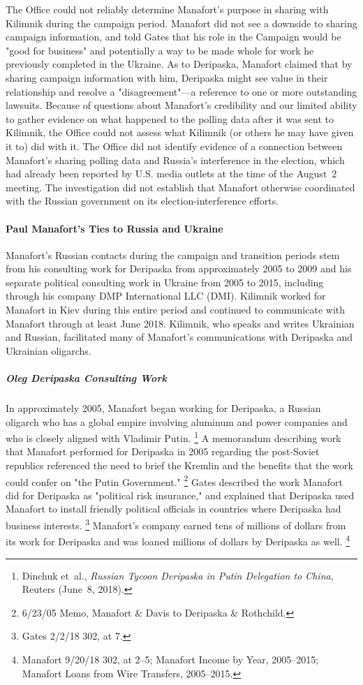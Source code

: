 The Office could not reliably determine Manafort's purpose in sharing with Kilimnik during the campaign period.
Manafort
did not see a downside to sharing campaign information, and told Gates that his role in the Campaign would be "good for business" and potentially a way to be made whole for work he previously completed in the Ukraine.
As to Deripaska, Manafort claimed that by sharing campaign information with him, Deripaska might see value in their relationship and resolve a "disagreement"---a reference to one or more outstanding lawsuits.
Because of questions about Manafort's credibility and our limited ability to gather evidence on what happened to the polling data after it was sent to Kilimnik, the Office could not assess what Kilimnik (or others he may have given it to) did with it.
The Office did not identify evidence of a connection between Manafort's sharing polling data and Russia's interference in the election, which had already been reported by U.S. media outlets at the time of the August~2 meeting.
The investigation did not establish that Manafort otherwise coordinated with the Russian government on its election-interference efforts.

\paragraph{Paul Manafort's Ties to Russia and Ukraine}

Manafort's Russian contacts during the campaign and transition periods stem from his consulting work for Deripaska from approximately 2005 to 2009 and his separate political consulting work in Ukraine from 2005 to 2015, including through his company DMP International LLC (DMI).
Kilimnik worked for Manafort in Kiev during this entire period and continued to communicate with Manafort through at least June 2018.
Kilimnik, who speaks and writes Ukrainian and Russian, facilitated many of Manafort's communications with Deripaska and Ukrainian oligarchs.

\subparagraph{Oleg Deripaska Consulting Work}

In approximately 2005, Manafort began working for Deripaska, a Russian oligarch who has a global empire involving aluminum and power companies and who is closely aligned with Vladimir Putin.%
\footnote{Dinchuk et~al., \textit{Russian Tycoon Deripaska in Putin Delegation to China}, Reuters (June~8, 2018).}
A memorandum describing work that Manafort performed for Deripaska in 2005 regarding the post-Soviet republics referenced the need to brief the Kremlin and the benefits that the work could confer on "the Putin Government."%
\footnote{6/23/05 Memo, Manafort \& Davis to Deripaska \& Rothchild.}
Gates described the work Manafort did for Deripaska as "political risk insurance," and explained that Deripaska used Manafort to install friendly political officials in countries where Deripaska had business interests.%
\footnote{Gates 2/2/18 302, at 7.}
Manafort's company earned tens of millions of dollars from its work for Deripaska and was loaned millions of dollars by Deripaska as well.%
\footnote{Manafort 9/20/18 302, at 2--5;
Manafort Income by Year, 2005--2015;
Manafort Loans from Wire Transfers, 2005--2015.}

